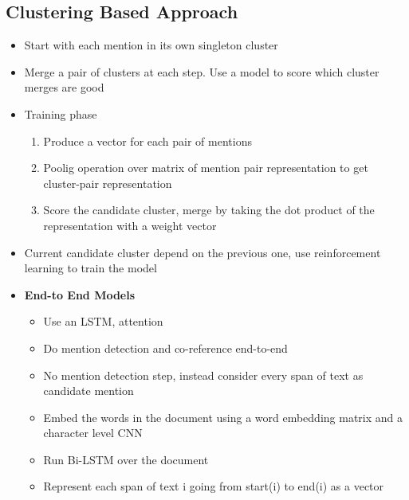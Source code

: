 \subsection{Clustering Based Approach}
\begin{itemize}
    \item Start with each mention in its own singleton cluster
    \item Merge a pair of clusters at each step. Use a model to score which cluster merges are good
    \item Training phase
    \begin{enumerate}
        \item Produce a vector for each pair of mentions
        \item Poolig operation over matrix of mention pair representation to get cluster-pair representation
        \item Score the candidate cluster, merge by taking the dot product of the representation with a weight vector
    \end{enumerate}
    \item Current candidate cluster depend on the previous one, use reinforcement learning to train the model
    \item \textbf{End-to End Models}
    \begin{itemize}
        \item Use an LSTM, attention
        \item Do mention detection and co-reference end-to-end
        \item No mention detection step, instead consider every span of text as candidate mention
        \item Embed the words in the document using a word embedding matrix and a character level CNN
        \item Run Bi-LSTM over the document
        \item Represent each span of text i going from start(i) to end(i) as a vector
    \end{itemize}
\end{itemize}